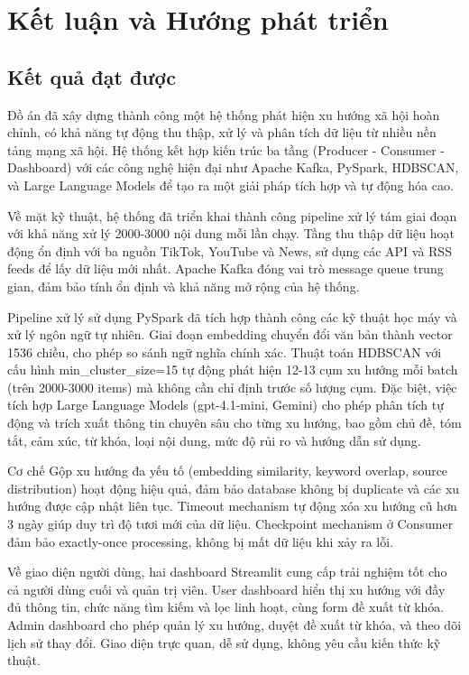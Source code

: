 
\chapter{Kết luận và Hướng phát triển}

\section{Kết quả đạt được}

Đồ án đã xây dựng thành công một hệ thống phát hiện xu hướng xã hội hoàn chỉnh, có khả năng tự động thu thập, xử lý và phân tích dữ liệu từ nhiều nền tảng mạng xã hội. Hệ thống kết hợp kiến trúc ba tầng (Producer - Consumer - Dashboard) với các công nghệ hiện đại như Apache Kafka, PySpark, HDBSCAN, và Large Language Models để tạo ra một giải pháp tích hợp và tự động hóa cao.

Về mặt kỹ thuật, hệ thống đã triển khai thành công pipeline xử lý tám giai đoạn với khả năng xử lý 2000-3000 nội dung mỗi lần chạy. Tầng thu thập dữ liệu hoạt động ổn định với ba nguồn TikTok, YouTube và News, sử dụng các API và RSS feeds để lấy dữ liệu mới nhất. Apache Kafka đóng vai trò message queue trung gian, đảm bảo tính ổn định và khả năng mở rộng của hệ thống.

Pipeline xử lý sử dụng PySpark đã tích hợp thành công các kỹ thuật học máy và xử lý ngôn ngữ tự nhiên. Giai đoạn embedding chuyển đổi văn bản thành vector 1536 chiều, cho phép so sánh ngữ nghĩa chính xác. Thuật toán HDBSCAN với cấu hình min\_cluster\_size=15 tự động phát hiện 12-13 cụm xu hướng mỗi batch (trên 2000-3000 items) mà không cần chỉ định trước số lượng cụm. Đặc biệt, việc tích hợp Large Language Models (gpt-4.1-mini, Gemini) cho phép phân tích tự động và trích xuất thông tin chuyên sâu cho từng xu hướng, bao gồm chủ đề, tóm tắt, cảm xúc, từ khóa, loại nội dung, mức độ rủi ro và hướng dẫn sử dụng.

Cơ chế Gộp xu hướng đa yếu tố (embedding similarity, keyword overlap, source distribution) hoạt động hiệu quả, đảm bảo database không bị duplicate và các xu hướng được cập nhật liên tục. Timeout mechanism tự động xóa xu hướng cũ hơn 3 ngày giúp duy trì độ tươi mới của dữ liệu. Checkpoint mechanism ở Consumer đảm bảo exactly-once processing, không bị mất dữ liệu khi xảy ra lỗi.

Về giao diện người dùng, hai dashboard Streamlit cung cấp trải nghiệm tốt cho cả người dùng cuối và quản trị viên. User dashboard hiển thị xu hướng với đầy đủ thông tin, chức năng tìm kiếm và lọc linh hoạt, cùng form đề xuất từ khóa. Admin dashboard cho phép quản lý xu hướng, duyệt đề xuất từ khóa, và theo dõi lịch sử thay đổi. Giao diện trực quan, dễ sử dụng, không yêu cầu kiến thức kỹ thuật.

